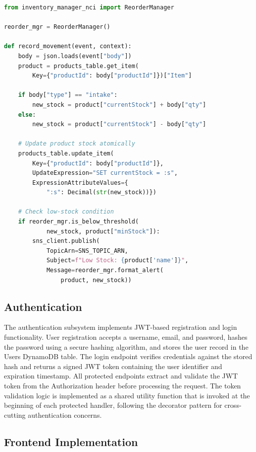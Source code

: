 \documentclass[conference]{IEEEtran}
\begin{document}
\begin{lstlisting}[language=Python, caption={Stock movement with SNS low-stock alert}]
from inventory_manager_nci import ReorderManager

reorder_mgr = ReorderManager()

def record_movement(event, context):
    body = json.loads(event["body"])
    product = products_table.get_item(
        Key={"productId": body["productId"]})["Item"]

    if body["type"] == "intake":
        new_stock = product["currentStock"] + body["qty"]
    else:
        new_stock = product["currentStock"] - body["qty"]

    # Update product stock atomically
    products_table.update_item(
        Key={"productId": body["productId"]},
        UpdateExpression="SET currentStock = :s",
        ExpressionAttributeValues={
            ":s": Decimal(str(new_stock))})

    # Check low-stock condition
    if reorder_mgr.is_below_threshold(
            new_stock, product["minStock"]):
        sns_client.publish(
            TopicArn=SNS_TOPIC_ARN,
            Subject=f"Low Stock: {product['name']}",
            Message=reorder_mgr.format_alert(
                product, new_stock))
\end{lstlisting}

\subsection{Authentication}

The authentication subsystem implements JWT-based registration and login functionality. User registration accepts a username, email, and password, hashes the password using a secure hashing algorithm, and stores the user record in the Users DynamoDB table. The login endpoint verifies credentials against the stored hash and returns a signed JWT token containing the user identifier and expiration timestamp. All protected endpoints extract and validate the JWT token from the Authorization header before processing the request. The token validation logic is implemented as a shared utility function that is invoked at the beginning of each protected handler, following the decorator pattern for cross-cutting authentication concerns.

\subsection{Frontend Implementation}
\end{document}
